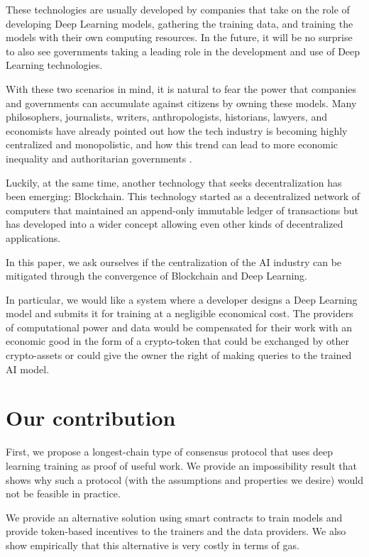 \documentclass[conference]{IEEEtran}
\begin{document}
    These technologies are usually developed by companies that take on the role of developing Deep Learning models, gathering the training data, and training the models with their own computing resources. In the future, it will be no surprise to also see governments taking a leading role in the development and use of Deep Learning technologies.
    
    With these two scenarios in mind, it is natural to fear the power that companies and governments can accumulate against citizens by owning these models. Many philosophers, journalists, writers, anthropologists, historians, lawyers, and economists have already pointed out how the tech industry is becoming highly centralized and monopolistic, and how this trend can lead to more economic inequality and authoritarian governments \cite{b1} \cite{b2} \cite{b3} \cite{b4}.
    
    Luckily, at the same time, another technology that seeks decentralization has been emerging: Blockchain. This technology started as a decentralized network of computers that maintained an append-only immutable ledger of transactions \cite{b6} but has developed into a wider concept allowing even other kinds of decentralized applications.
    
    In this paper, we ask ourselves if the centralization of the AI industry can be mitigated through the convergence of Blockchain and Deep Learning.
    
    In particular, we would like a system where a developer designs a Deep Learning model and submits it for training at a negligible economical cost. The providers of computational power and data would be compensated for their work with an economic good in the form of a crypto-token that could be exchanged by other crypto-assets or could give the owner the right of making queries to the trained AI model.
    
    \section{Our contribution}
    First, we propose a longest-chain type of consensus protocol that uses deep learning training as proof of useful work. We provide an impossibility result that shows why such a protocol (with the assumptions and properties we desire) would not be feasible in practice.
    
    We provide an alternative solution using smart contracts to train models and provide token-based incentives to the trainers and the data providers. We also show empirically that this alternative is very costly in terms of gas.
    
\end{document}

